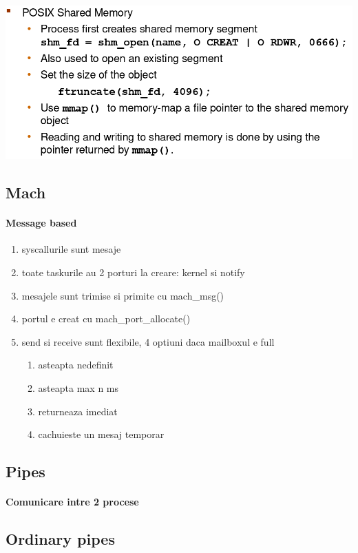 \documentclass{article}
\begin{document}
\begin{center}
    \includegraphics[scale=0.3]{7_sharedmem.png}
\end{center}

\subsection*{Mach}
\paragraph*{Message based}
\begin{enumerate}
    \item syscallurile sunt mesaje
    \item toate taskurile au 2 porturi la creare: kernel si notify
    \item mesajele sunt trimise si primite cu mach\_msg()
    \item portul e creat cu mach\_port\_allocate()
    \item send si receive sunt flexibile, 4 optiuni daca mailboxul e full
    \begin{enumerate}
        \item asteapta nedefinit
        \item asteapta max n ms
        \item returneaza imediat
        \item cachuieste un mesaj temporar
    \end{enumerate}
\end{enumerate}

\subsection*{Pipes}
\paragraph*{Comunicare intre 2 procese}
\subsection*{Ordinary pipes}
\end{document}
